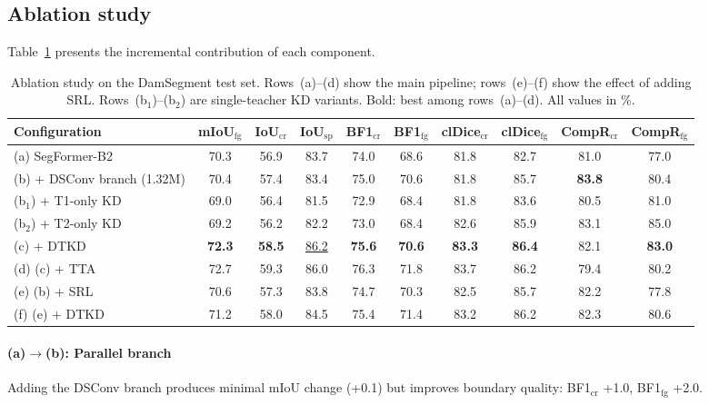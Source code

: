 \documentclass[review,authoryear]{elsarticle}
\begin{document}
\subsection{Ablation study}
\label{sec:ablation}

Table~\ref{tab:ablation} presents the incremental contribution of each component.

\begin{table}[t]
\centering
\caption{Ablation study on the DamSegment test set. Rows~(a)--(d) show the main pipeline; rows~(e)--(f) show the effect of adding SRL. Rows~(b$_1$)--(b$_2$) are single-teacher KD variants. Bold: best among rows~(a)--(d). All values in \%.}
\label{tab:ablation}
\begin{tabular}{lccccccccc}
\toprule
Configuration & mIoU$_{\text{fg}}$ & IoU$_{\text{cr}}$ & IoU$_{\text{sp}}$ & BF1$_{\text{cr}}$ & BF1$_{\text{fg}}$ & clDice$_{\text{cr}}$ & clDice$_{\text{fg}}$ & CompR$_{\text{cr}}$ & CompR$_{\text{fg}}$ \\
\midrule
(a) SegFormer-B2 & 70.3 & 56.9 & 83.7 & 74.0 & 68.6 & 81.8 & 82.7 & 81.0 & 77.0 \\
(b) + DSConv branch (1.32M) & 70.4 & 57.4 & 83.4 & 75.0 & 70.6 & 81.8 & 85.7 & \textbf{83.8} & 80.4 \\
(b$_1$) + T1-only KD & 69.0 & 56.4 & 81.5 & 72.9 & 68.4 & 81.8 & 83.6 & 80.5 & 81.0 \\
(b$_2$) + T2-only KD & 69.2 & 56.2 & 82.2 & 73.0 & 68.4 & 82.6 & 85.9 & 83.1 & 85.0 \\
(c) + DTKD & \textbf{72.3} & \textbf{58.5} & \underline{86.2} & \textbf{75.6} & \textbf{70.6} & \textbf{83.3} & \textbf{86.4} & 82.1 & \textbf{83.0} \\
(d) (c) + TTA & 72.7 & 59.3 & 86.0 & 76.3 & 71.8 & 83.7 & 86.2 & 79.4 & 80.2 \\
\midrule
(e) (b) + SRL & 70.6 & 57.3 & 83.8 & 74.7 & 70.3 & 82.5 & 85.7 & 82.2 & 77.8 \\
(f) (e) + DTKD & 71.2 & 58.0 & 84.5 & 75.4 & 71.4 & 83.2 & 86.2 & 82.3 & 80.6 \\
\bottomrule
\end{tabular}
\end{table}

\paragraph{(a)$\to$(b): Parallel branch}
Adding the DSConv branch produces minimal mIoU change (+0.1) but improves boundary quality: BF1$_{\text{cr}}$ +1.0, BF1$_{\text{fg}}$ +2.0.
\end{document}
